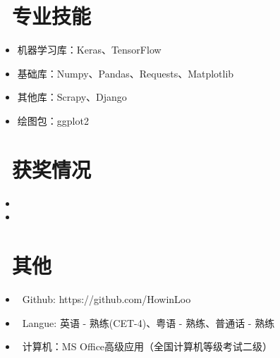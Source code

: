 \documentclass{resume}
\begin{document}


\section{\faCogs\ 专业技能}
\begin{itemize}[parsep=0.5ex]
  \item 机器学习库：Keras、TensorFlow
  \item 基础库：Numpy、Pandas、Requests、Matplotlib
  \item 其他库：Scrapy、Django
\end{itemize}

\begin{itemize}[parsep=0.5ex]
  \item 绘图包：ggplot2
\end{itemize}




\section{\faTrophy\ 获奖情况}
\begin{itemize}
    \item {}
    \item {}
\end{itemize}


\section{\faInfo\ 其他}
\begin{itemize}[parsep=0.5ex]
  \item \faGithub\ Github: https://github.com/HowinLoo
  \item \faLanguage\ Langue: 英语 - 熟练(CET-4)、粤语 - 熟练、普通话 - 熟练
  \item \faDesktop\ 计算机：MS Office高级应用（全国计算机等级考试二级）
\end{itemize}
\end{document}
